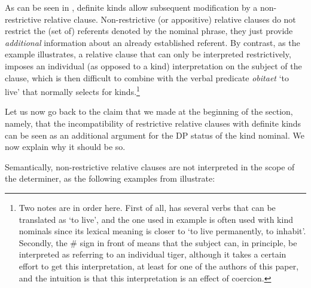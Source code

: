 \documentclass[output=paper
,modfonts
,nonflat]{langsci/langscibook}
\begin{document}
	\ea\label{ex:borik:24}
	\z
	\z
	
	As can be seen in , definite kinds allow subsequent modification by a non-restrictive relative clause. Non-restrictive (or appositive) relative clauses do not restrict the (set of) referents denoted by the nominal phrase, they just provide \textit{additional} information about an already established referent. By contrast, as the example  illustrates, a relative clause that can only be interpreted restrictively, imposes an individual (as opposed to a kind) interpretation on the subject of the clause, which is then difficult to combine with the verbal predicate \textit{obitaet} `to live' that normally selects for kinds.\footnote{Two notes are in order here. First of all,  has several verbs that can be translated as `to live', and the one used in example  is often used with kind nominals since its lexical meaning is closer to `to live permanently, to inhabit'. Secondly, the \# sign in front of  means that the subject can, in principle, be interpreted as referring to an individual tiger, although it takes a certain effort to get this interpretation, at least for one of the authors of this paper, and the intuition is that this interpretation is an effect of coercion.}
	
	Let us now go back to the claim that we made at the beginning of the section, namely, that the incompatibility of restrictive relative clauses with definite kinds can be seen as an additional argument for the DP status of the kind nominal. We now explain why it should be so. 
	
	Semantically, non-restrictive relative clauses are not interpreted in the scope of the determiner, as the following examples from  illustrate: 
	
\end{document}
